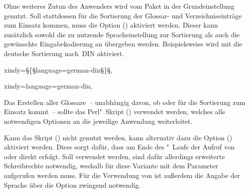 \documentclass[%
  english,ngerman,%
  cdgeometry=no,DIV=12,%
  automark,%
  listof=toc,%
]{tudscrartcl}
\begin{document}
Ohne weiteres Zutun des Anwenders wird vom Paket  in der 
Grundeinstellung  genutzt. Soll stattdessen für die 
Sortierung der Glossar- und Verzeichniseinträge  zum Einsatz 
kommen, muss die Option () aktiviert werden.
Dieser kann zusätzlich sowohl die zu nutzende Spracheinstellung zur Sortierung 
als auch die gewünschte Eingabekodierung an  übergeben 
werden. Beispielsweise wird mit 
die deutsche Sortierung nach~DIN aktiviert.
%
\begin{Hint}
  xindy=§\{§language=german-din§\}§, %
\end{Hint}
\begin{Preamble+}
  xindy={language=german-din},
\end{Preamble+}
%
Das Erstellen aller Glossare~-- unabhängig davon, ob  oder 
 für die Sortierung zum Einsatz kommt~-- sollte das 
Perl"~Skript () verwendet werden, 
welches alle notwendigen Optionen an die jeweilige Anwendung weiterleitet.


Kann das Skript () nicht genutzt 
werden, kann alternativ dazu die Option ()
aktiviert werden. Diese sorgt dafür, dass am Ende des "~Laufs 
der Aufruf von  oder  direkt erfolgt. 
Soll  verwendet werden, sind dafür allerdings erweiterte 
Schreibrechte notwendig, weshalb für diese Variante  mit dem 
Parameter  aufgerufen werden muss. Für die Verwendung 
von  ist außerdem die Angabe der Sprache über die Option 
 zwingend notwendig. 
\end{document}
